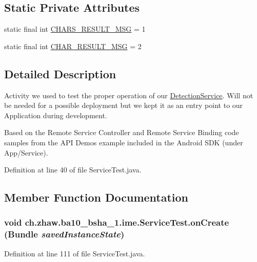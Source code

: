 \subsection*{Static Private Attributes}
\begin{DoxyCompactItemize}
\item 
static final int \hyperlink{classch_1_1zhaw_1_1ba10__bsha__1_1_1ime_1_1ServiceTest_ac1d59d2fe1c01777f19b3c9bdf279f4f}{CHARS\_\-RESULT\_\-MSG} = 1
\item 
static final int \hyperlink{classch_1_1zhaw_1_1ba10__bsha__1_1_1ime_1_1ServiceTest_af5742511ec4008834a2d1354102ce616}{CHAR\_\-RESULT\_\-MSG} = 2
\end{DoxyCompactItemize}


\subsection{Detailed Description}
Activity we used to test the proper operation of our \hyperlink{}{DetectionService}. Will not be needed for a possible deployment but we kept it as an entry point to our Application during development.

Based on the Remote Service Controller and Remote Service Binding code samples from the API Demos example included in the Android SDK (under App/Service). 

Definition at line 40 of file ServiceTest.java.

\subsection{Member Function Documentation}
\hypertarget{classch_1_1zhaw_1_1ba10__bsha__1_1_1ime_1_1ServiceTest_a26ed9a2164e8ed852c0755ed175c3805}{
\subsubsection[{onCreate}]{\setlength{\rightskip}{0pt plus 5cm}void ch.zhaw.ba10\_\-bsha\_\-1.ime.ServiceTest.onCreate (Bundle {\em savedInstanceState})}}
\label{classch_1_1zhaw_1_1ba10__bsha__1_1_1ime_1_1ServiceTest_a26ed9a2164e8ed852c0755ed175c3805}


Definition at line 111 of file ServiceTest.java.

